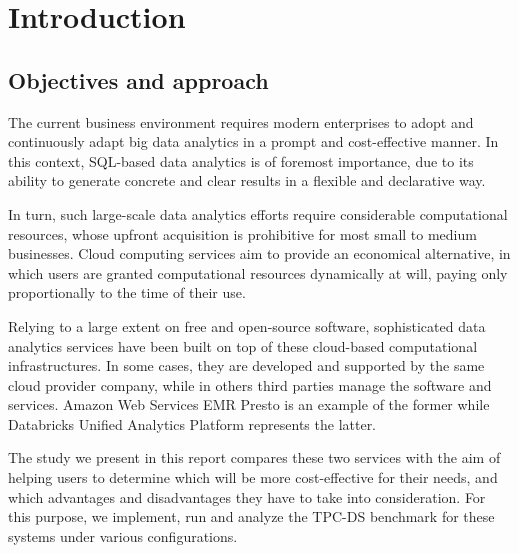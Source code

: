 \section{Introduction}\label{introduction}
\subsection{Objectives and approach}
The current business environment requires modern enterprises to adopt and continuously adapt big data analytics in a prompt and cost-effective manner. In this context, SQL-based data analytics is of foremost importance, due to its ability to generate concrete and clear results in a flexible and declarative way.

In turn, such large-scale data analytics efforts require considerable computational resources, whose upfront acquisition is prohibitive for most small to medium businesses. Cloud computing services aim to provide an economical alternative, in which users are granted computational resources dynamically at will, paying only proportionally to the time of their use.

Relying to a large extent on free and open-source software, sophisticated data analytics services have been built on top of these cloud-based computational infrastructures. In some cases, they are developed and supported by the same cloud provider company, while in others third parties manage the software and services. Amazon Web Services EMR Presto is an example of the former while Databricks Unified Analytics Platform represents the latter.

The study we present in this report compares these two services with the aim of helping users to determine which will be more cost-effective for their needs, and which advantages and disadvantages they have to take into consideration. For this purpose, we implement, run and analyze the TPC-DS benchmark for these systems under various configurations.

